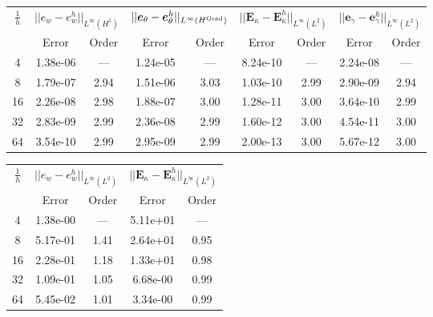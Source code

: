 \begin{table}[hp]
	\centering
	\begin{tabular}{ccccccccc}
		\hline 
		\multirow{2}{*}{$\frac{1}{h}$} & \multicolumn{2}{c}{$||e_w - e_w^h||_{L^{\infty}(H^1)}$}    & \multicolumn{2}{c}{$||\bm{e}_\theta - \bm{e}_\theta^h||_{L^{\infty}(H^{\operatorname*{Grad}})}$} & \multicolumn{2}{c}{$||\bm{E}_\kappa - \bm{E}_\kappa^h||_{L^{\infty}(L^2)}$} & \multicolumn{2}{c}{$||\bm{e}_\gamma - \bm{e}_\gamma^ h||_{L^{\infty}(L^2)}$}   \\
		& Error & Order  & Error & Order  & Error & Order  & Error & Order   \\ 
		\hline 
		4  & 1.38e-06 & ---  & 1.24e-05 & ---  & 8.24e-10 & ---  & 2.24e-08 & --- \\ 
		8  & 1.79e-07 & 2.94 & 1.51e-06 & 3.03 & 1.03e-10 & 2.99 & 2.90e-09 & 2.94\\ 
		16 & 2.26e-08 & 2.98 & 1.88e-07 & 3.00 & 1.28e-11 & 3.00 & 3.64e-10 & 2.99\\ 
		32 & 2.83e-09 & 2.99 & 2.36e-08 & 2.99 & 1.60e-12 & 3.00 & 4.54e-11 & 3.00\\ 
		64 & 3.54e-10 & 2.99 & 2.95e-09 & 2.99 & 2.00e-13 & 3.00 & 5.67e-12 & 3.00\\ 
		\hline 
	\end{tabular} 
	\captionsetup{width=0.95\linewidth}
	\vspace{1mm}
	\label{tab:resminCGDG_k3}
\end{table}


\begin{table}[hp]
	\centering
	\begin{tabular}{ccccc}
		\hline 
		\multirow{2}{*}{$\frac{1}{h}$} & \multicolumn{2}{c}{$||e_w - e_w^h||_{L^{\infty}(L^2)}$}  & \multicolumn{2}{c}{$||\bm{E}_\kappa - \bm{E}_\kappa^h||_{L^{\infty}(L^2)}$}   \\ 
		& Error & Order  & Error & Order  \\
		\hline 
		4  & 1.38e-00 & ---  & 5.11e+01 & ---  \\ 
		8  & 5.17e-01 & 1.41 & 2.64e+01 & 0.95 \\ 
		16 & 2.28e-01 & 1.18 & 1.33e+01 & 0.98 \\ 
		32 & 1.09e-01 & 1.05 & 6.68e-00 & 0.99 \\ 
		64 & 5.45e-02 & 1.01 & 3.34e-00 & 0.99 \\ 
		\hline 
	\end{tabular} 
	\captionsetup{width=0.95\linewidth}
	\vspace{1mm}
	\label{tab:resminHHJ_SSSS_k1}
\end{table}

